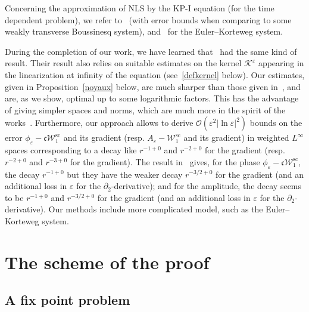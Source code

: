 \documentclass[10pt]{amsart}
\theoremstyle{definition}\newtheorem{defi}[theo]{Definition}\newtheorem{rema}[theo]{Remark}\newtheorem{exam}[theo]{Example}\newtheorem{exem}[theo]{Example}\newtheorem{nota}[theo]{Notation}
\newcommand*\p{\partial}
\renewcommand{\sc}{\mathrm{sc}}
\newcommand*\BO{\mathcal{O}}
\newcommand*\BK{\mathcal{K}}
\newcommand*\BW{\mathcal{W}}
\newcommand*\cs{{\mathfrak c}}
\newcommand*\ii{\infty}
\newcommand*\e{\varepsilon}
\newcommand*\lne{\lvert \ln \varepsilon \rvert}
\begin{document}
Concerning the approximation of NLS by the KP-I equation (for the time dependent problem), we refer to~\cite{Chi-Rou,Cerror} (with error bounds when comparing to some weakly transverse Boussinesq system), and~\cite{Ben_Chi} for the Euler--Korteweg system.



During the completion of our work, we have learned that~\cite{LWWY} had the same kind of result. Their result also relies on suitable estimates on the kernel $ \BK^\e $ appearing in the linearization at infinity of the equation (see~\eqref{defkernel} below). Our estimates, given in Proposition~\ref{noyaux} below, are much sharper than those given in~\cite[Lemmas~3.1 and 3.2]{LWWY}, and are, as we show, optimal up to some logarithmic factors. This has the advantage of giving simpler spaces and norms, which are much more in the spirit of the works~\cite{BGStranso2d,CM1}. Furthermore, our approach allows to derive $ \BO (\e^2 \lne^2) $ bounds on the error $ \phi_\e - \cs \BW_1^{\sc} $ and its gradient (resp. $ A_\e - \BW_1^{\sc} $ and its gradient) in weighted $ L^\ii $ spaces corresponding to a decay like $ r^{-1+0} $ and $ r^{-2+0} $ for the gradient (resp. $ r^{-2+0} $ and $ r^{-3+0} $ for the gradient). The result in~\cite{LWWY} gives, for the phase $ \phi_\e - \cs \BW_1^{\sc} $, the decay $ r^{-1+0} $ but they have the weaker decay $ r^{-3/2 + 0 } $ for the gradient (and an additional loss in $ \e $ for the $ \p_2 $-derivative); and for the amplitude, the decay seems to be $ r^{-1+0} $ and $ r^{-3/2 + 0 } $ for the gradient (and an additional loss in $ \e $ for the $ \p_2 $-derivative). Our methods include more complicated model, such as the Euler--Korteweg system.



\section{The scheme of the proof}


\subsection{A fix point problem}
\end{document}
